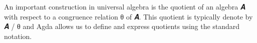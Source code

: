 \documentclass[a4paper,UKenglish,cleveref,autoref,thm-restate,11pt]{lipics-v2021}
\begin{document}
An important construction in universal algebra is the quotient of an algebra \ab 𝑨 with respect to a congruence relation \af θ of \ab 𝑨. This quotient is typically denote by \ab 𝑨 \af / \af θ and Agda allows us to define and express quotients using the standard notation.
\ccpad
\begin{code}%
\>[0]\AgdaSpace{}%
\AgdaSymbol{:}\AgdaSpace{}%
\AgdaSymbol{\{}\AgdaSpace{}%
\AgdaSpace{}%
\AgdaSymbol{:}\AgdaSpace{}%
\AgdaSymbol{\}(}\AgdaSpace{}%
\AgdaSymbol{:}\AgdaSpace{}%
\AgdaSpace{}%
\AgdaSpace{}%
\AgdaSymbol{)}\AgdaSpace{}%
\AgdaSpace{}%
\AgdaSymbol{\{}\AgdaSymbol{\}\{}\AgdaSymbol{\}}\AgdaSpace{}%
\AgdaSpace{}%
\AgdaSpace{}%
\AgdaSpace{}%
\AgdaSymbol{(}\AgdaSpace{}%
\AgdaSpace{}%
\AgdaSpace{}%
\AgdaSymbol{)}\AgdaSpace{}%
\<%
\\
%
\\[\AgdaEmptyExtraSkip]%
\>[0]\AgdaSpace{}%
\AgdaSpace{}%
\AgdaSpace{}%
\AgdaSymbol{=}%
\>[258I]\AgdaSymbol{(}\AgdaSpace{}%
\AgdaSpace{}%
\AgdaSpace{}%
\AgdaSpace{}%
\AgdaOperator{\AgdaFunction{/}}\AgdaSpace{}%
\AgdaSpace{}%
\AgdaSpace{}%
\AgdaSpace{}%
\AgdaSymbol{)}\AgdaSpace{}%
\AgdaOperator{\AgdaInductiveConstructor{,}}%
\>[29]\<%
\\
%
\\[\AgdaEmptyExtraSkip]%
\>[.][@{}l@{}]\<[258I]%
\>[8]\AgdaSpace{}%
\AgdaSpace{}%
\AgdaSpace{}%
\AgdaSpace{}%
\AgdaSpace{}%
\AgdaSymbol{(}\AgdaSpace{}%
\AgdaSpace{}%
\AgdaSymbol{)}\AgdaSpace{}%
\AgdaSpace{}%
\AgdaSpace{}%
\AgdaSpace{}%
\AgdaSpace{}%
\AgdaSpace{}%
\AgdaSpace{}%
\AgdaSpace{}%
\AgdaSpace{}%
\AgdaSymbol{)}\AgdaSpace{}%
%
\>[29]\<%
\end{code}
\end{document}
